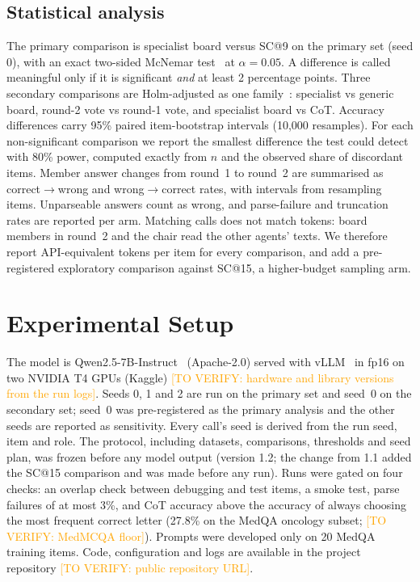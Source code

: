 \IfFileExists{IEEEtran.cls}{\documentclass[conference]{IEEEtran}}{\documentclass[10pt,twocolumn]{article}\usepackage[margin=0.75in]{geometry}}
\newcommand{\toverify}[1]{\textcolor{orange}{[TO VERIFY: #1]}}
\begin{document}
\subsection{Statistical analysis}
The primary comparison is specialist board versus SC@9 on the primary set (seed 0), with an exact two-sided McNemar test~\cite{mcnemar1947} at $\alpha=0.05$. A difference is called meaningful only if it is significant \emph{and} at least 2 percentage points. Three secondary comparisons are Holm-adjusted as one family~\cite{holm1979}: specialist vs generic board, round-2 vote vs round-1 vote, and specialist board vs CoT. Accuracy differences carry 95\% paired item-bootstrap intervals (10{,}000 resamples). For each non-significant comparison we report the smallest difference the test could detect with 80\% power, computed exactly from $n$ and the observed share of discordant items. Member answer changes from round~1 to round~2 are summarised as correct$\to$wrong and wrong$\to$correct rates, with intervals from resampling items. Unparseable answers count as wrong, and parse-failure and truncation rates are reported per arm. Matching calls does not match tokens: board members in round~2 and the chair read the other agents' texts. We therefore report API-equivalent tokens per item for every comparison, and add a pre-registered exploratory comparison against SC@15, a higher-budget sampling arm.

\section{Experimental Setup}
The model is Qwen2.5-7B-Instruct~\cite{qwen2025qwen25} (Apache-2.0) served with vLLM~\cite{kwon2023vllm} in fp16 on two NVIDIA T4 GPUs (Kaggle) \toverify{hardware and library versions from the run logs}. Seeds 0, 1 and 2 are run on the primary set and seed~0 on the secondary set; seed~0 was pre-registered as the primary analysis and the other seeds are reported as sensitivity. Every call's seed is derived from the run seed, item and role. The protocol, including datasets, comparisons, thresholds and seed plan, was frozen before any model output (version 1.2; the change from 1.1 added the SC@15 comparison and was made before any run). Runs were gated on four checks: an overlap check between debugging and test items, a smoke test, parse failures of at most 3\%, and CoT accuracy above the accuracy of always choosing the most frequent correct letter (27.8\% on the MedQA oncology subset; \toverify{MedMCQA floor}). Prompts were developed only on 20 MedQA training items. Code, configuration and logs are available in the project repository \toverify{public repository URL}.
\end{document}
